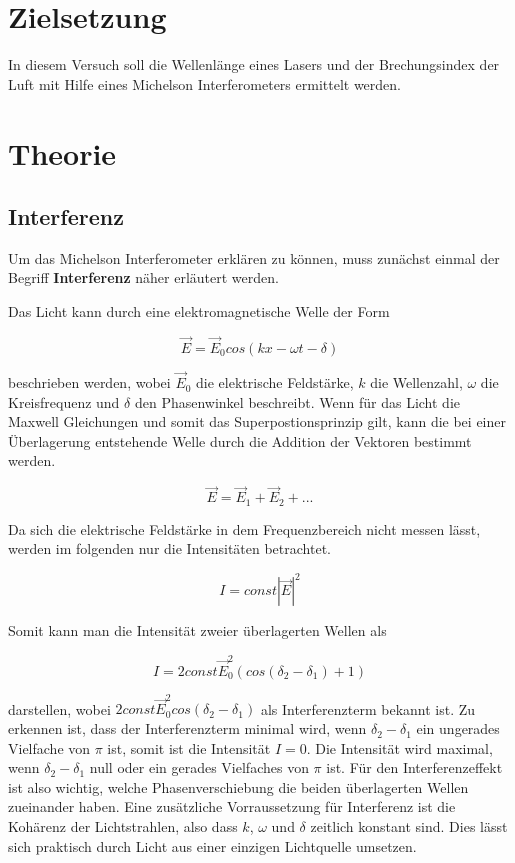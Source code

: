 \section{Zielsetzung}
In diesem Versuch soll die Wellenlänge eines Lasers und der Brechungsindex der Luft mit Hilfe eines Michelson Interferometers
ermittelt werden.

\section{Theorie}
\subsection{Interferenz}
Um das Michelson Interferometer erklären zu können, muss zunächst einmal der Begriff \textbf{Interferenz} näher erläutert werden.

Das Licht kann durch eine elektromagnetische Welle der Form

\begin{equation*}
  \vec{E} = \vec{E}_0 cos(kx - \omega t - \delta)
\end{equation*}

beschrieben werden, wobei $\vec{E}_0$ die elektrische Feldstärke, $k$ die Wellenzahl, $\omega$ die Kreisfrequenz und $\delta$ den
Phasenwinkel beschreibt. Wenn für das Licht die Maxwell Gleichungen und somit das Superpostionsprinzip gilt, kann die bei einer Überlagerung
entstehende Welle durch die Addition der Vektoren bestimmt werden.

\begin{equation*}
  \vec{E} = \vec{E}_1 + \vec{E}_2 + ...
\end{equation*}

Da sich die elektrische Feldstärke in dem Frequenzbereich nicht messen lässt, werden im folgenden nur die Intensitäten betrachtet.

\begin{equation*}
  I = const |\vec{E}|^2
\end{equation*}

Somit kann man die Intensität zweier überlagerten Wellen als

\begin{equation*}
  I = 2 const \vec{E}_0^2 (cos(\delta_2 - \delta_1) + 1)
\end{equation*}

darstellen, wobei $ 2 const \vec{E}_0^2 cos(\delta_2 - \delta_1) $ als Interferenzterm bekannt ist. Zu erkennen ist, dass der Interferenzterm
minimal wird, wenn $\delta_2 - \delta_1$ ein ungerades Vielfache von $\pi$ ist, somit ist die Intensität $ I=0$. Die Intensität wird maximal, wenn
$\delta_2 - \delta_1$ null oder ein gerades Vielfaches von $\pi$ ist. Für den Interferenzeffekt ist also wichtig, welche Phasenverschiebung die beiden
überlagerten Wellen zueinander haben.
Eine zusätzliche Vorraussetzung für Interferenz ist die Kohärenz der Lichtstrahlen, also dass $k$, $\omega$ und $\delta$ zeitlich konstant sind. Dies lässt
sich praktisch durch Licht aus einer einzigen Lichtquelle umsetzen.

